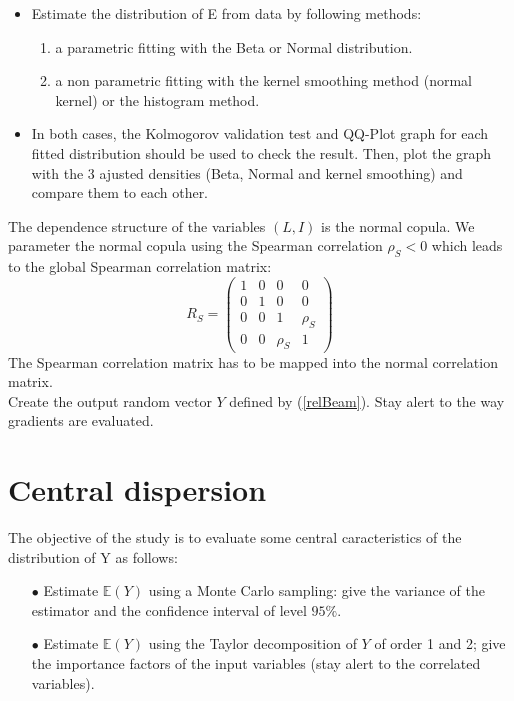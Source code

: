 \documentclass[11pt, french, A4wide]{article}
\theoremstyle{remark}
\theoremstyle{definition}
\begin{document}
\vspace*{0.2cm}

\begin{itemize}
 	\item Estimate the distribution of E from data by following methods:
  	\begin{enumerate}
		\item a parametric fitting with the Beta or Normal distribution. 
     	\item a non parametric fitting with the kernel smoothing method (normal kernel) or the histogram method.
   \end{enumerate}
   \item In both cases, the Kolmogorov validation test and QQ-Plot graph for each fitted distribution should be used to check the result. Then, plot the graph with the 3 ajusted densities (Beta, Normal and kernel smoothing) and compare them to each other.
\end{itemize}


\vspace*{0.2cm}

The dependence structure of the variables $(L,I)$ is the normal copula. We parameter the normal copula using the Spearman correlation $\rho_S<0$ which leads to the global Spearman correlation matrix:
$$
R_S = \left (
\begin{array}{cccc}
  1 & 0 & 0 & 0 \\
  0 & 1 & 0 & 0 \\
  0 & 0 & 1 & \rho_S \\
  0 & 0 & \rho_S & 1
\end{array}
\right)
$$
The Spearman correlation matrix has to be mapped into the normal correlation matrix.\\

Create the output random vector $Y$ defined by (\ref{relBeam}). Stay alert to the way gradients are evaluated.


\section{Central dispersion}

The objective of the study is to evaluate some central caracteristics of the distribution of Y as follows:
\begin{itemize}
 \item[$\bullet$] Estimate $\mathbb{E}(Y)$ using a Monte Carlo sampling: give the variance of the estimator and the confidence interval of level $95 \%$.
 \item[$\bullet$] Estimate $\mathbb{E}(Y)$ using the Taylor decomposition of $Y$ of order 1 and 2; give the importance factors of the input variables (stay alert to the correlated variables).
\end{itemize}
\vspace*{0.2cm}
\end{document}
